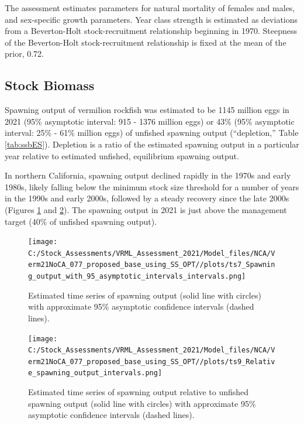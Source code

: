 \documentclass[11pt,
  english,
  a4paper,
]{article}
\begin{document}
The assessment estimates parameters for natural mortality of females and males, and sex-specific growth parameters. Year class strength is estimated as deviations from a Beverton-Holt stock-recruitment relationship beginning in 1970. Steepness of the Beverton-Holt stock-recruitment relationship is fixed at the mean of the prior, 0.72.

\FloatBarrier


\hypertarget{stock-biomass}{%
\subsection*{Stock Biomass}\label{stock-biomass}}

\leavevmode\tagmcend\tagstructend

Spawning output of vermilion rockfish was estimated to be 1145 million eggs in 2021 (95\% asymptotic interval: 915 - 1376 million eggs) or 43\% (95\% asymptotic interval: 25\% - 61\% million eggs) of unfished spawning output (``depletion,'' Table \ref{tab:ssbES}). Depletion is a ratio of the estimated spawning output in a particular year relative to estimated unfished, equilibrium spawning output.

In northern California, spawning output declined rapidly in the 1970s and early 1980s, likely falling below the minimum stock size threshold for a number of years in the 1990s and early 2000s, followed by a steady recovery since the late 2000s (Figures \ref{fig:ssbES} and \ref{fig:deplES}). The spawning output in 2021 is just above the management target (40\% of unfished spawning output).

\begin{figure}
\centering
\texttt{[image: C:/Stock\_Assessments/VRML\_Assessment\_2021/Model\_files/NCA/Verm21NoCA\_077\_proposed\_base\_using\_SS\_OPT//plots/ts7\_Spawning\_output\_with\_95\_asymptotic\_intervals\_intervals.png]}
\caption{Estimated time series of spawning output (solid line with circles) with approximate 95\% asymptotic confidence intervals (dashed lines).\label{fig:ssbES}}
\end{figure}

\begin{figure}
\centering
\texttt{[image: C:/Stock\_Assessments/VRML\_Assessment\_2021/Model\_files/NCA/Verm21NoCA\_077\_proposed\_base\_using\_SS\_OPT//plots/ts9\_Relative\_spawning\_output\_intervals.png]}
\caption{Estimated time series of spawning output relative to unfished spawning output (solid line with circles) with approximate 95\% asymptotic confidence intervals (dashed lines).\label{fig:deplES}}
\end{figure}
\end{document}
